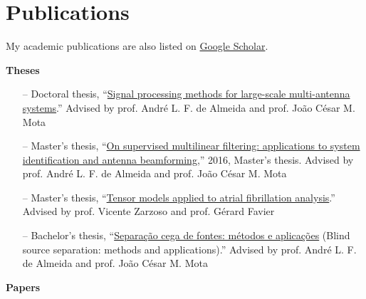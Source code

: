 \section{Publications}

My academic publications are also listed on \href{https://scholar.google.com.br/citations?user=STk6opQAAAAJ}{Google Scholar}.

{\bf Theses}\\

\begin{itemize}
	\item[--] Doctoral thesis, ``\href{http://repositorio.ufc.br/bitstream/riufc/47501/3/2019_tese_lnribeiro.pdf}{Signal processing methods for large-scale multi-antenna systems}.'' Advised by prof. Andr\'e L. F. de Almeida and prof. Jo\~ao C\'esar M. Mota
	\item[--] Master's thesis, ``\href{http://www.repositorio.ufc.br/bitstream/riufc/16516/1/2016_dis_lnribeiro.pdf}{On supervised multilinear filtering: applications to system identification and antenna beamforming},'' 2016, Master's thesis. Advised by prof. Andr\'e L. F. de Almeida and prof. Jo\~ao C\'esar M. Mota
	\item[--] Master's thesis, ``\href{https://github.com/lnribeiro/lnribeiro.github.io/blob/master/assets/pdf/rapport.pdf}{Tensor models applied to atrial fibrillation analysis}.'' Advised by prof. Vicente Zarzoso and prof. G\'erard Favier
	\item[--] Bachelor's thesis, ``\href{https://github.com/lnribeiro/lnribeiro.github.io/blob/master/assets/pdf/monografia.pdf}{Separação cega de fontes: métodos e aplicações} (Blind source separation: methods and applications).'' Advised by prof. Andr\'e L. F. de Almeida and prof. Jo\~ao C\'esar M. Mota
\end{itemize}

{\bf Papers}\\

